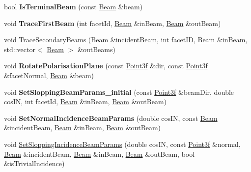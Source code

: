 \begin{DoxyCompactItemize}
\item 
\mbox{\label{class_tracing_a4ea27d6eac331e809307fcbb0acaf822}} 
bool {\bfseries Is\+Terminal\+Beam} (const \mbox{\hyperlink{class_beam}{Beam}} \&beam)
\item 
\mbox{\label{class_tracing_a2d192e0a23637161bcd7e49a60f12acc}} 
void {\bfseries Trace\+First\+Beam} (int facet\+Id, \mbox{\hyperlink{class_beam}{Beam}} \&in\+Beam, \mbox{\hyperlink{class_beam}{Beam}} \&out\+Beam)
\item 
void \mbox{\hyperlink{class_tracing_a1eb24906dd1db23bdffbdfc4d7864baf}{Trace\+Secondary\+Beams}} (\mbox{\hyperlink{class_beam}{Beam}} \&incident\+Beam, int facet\+ID, \mbox{\hyperlink{class_beam}{Beam}} \&in\+Beam, std\+::vector$<$ \mbox{\hyperlink{class_beam}{Beam}} $>$ \&out\+Beams)
\item 
\mbox{\label{class_tracing_a9cc5f8b35b0f3e5791ca62cb10e598e4}} 
void {\bfseries Rotate\+Polarisation\+Plane} (const \mbox{\hyperlink{struct_point3f}{Point3f}} \&dir, const \mbox{\hyperlink{struct_point3f}{Point3f}} \&facet\+Normal, \mbox{\hyperlink{class_beam}{Beam}} \&beam)
\item 
\mbox{\label{class_tracing_a25e87ab96197e6e13ba206c721305dee}} 
void {\bfseries Set\+Slopping\+Beam\+Params\+\_\+initial} (const \mbox{\hyperlink{struct_point3f}{Point3f}} \&beam\+Dir, double cos\+IN, int facet\+Id, \mbox{\hyperlink{class_beam}{Beam}} \&in\+Beam, \mbox{\hyperlink{class_beam}{Beam}} \&out\+Beam)
\item 
\mbox{\label{class_tracing_a2520c8204b764df82682b7ba7655559f}} 
void {\bfseries Set\+Normal\+Incidence\+Beam\+Params} (double cos\+IN, const \mbox{\hyperlink{class_beam}{Beam}} \&incident\+Beam, \mbox{\hyperlink{class_beam}{Beam}} \&in\+Beam, \mbox{\hyperlink{class_beam}{Beam}} \&out\+Beam)
\item 
void \mbox{\hyperlink{class_tracing_a426d2564586b18910ddd7407fcc5fd47}{Set\+Slopping\+Incidence\+Beam\+Params}} (double cos\+IN, const \mbox{\hyperlink{struct_point3f}{Point3f}} \&normal, \mbox{\hyperlink{class_beam}{Beam}} \&incident\+Beam, \mbox{\hyperlink{class_beam}{Beam}} \&in\+Beam, \mbox{\hyperlink{class_beam}{Beam}} \&out\+Beam, bool \&is\+Trivial\+Incidence)
\item 
\mbox{\label{class_tracing_a1eca7de1606439f44b85e6bc03e4f09e}} 

\end{DoxyCompactItemize}
